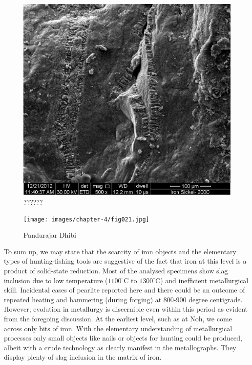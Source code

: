 \newpage

\begin{figure}[H]
\setcounter{figure}{19}
\includegraphics[scale=1]{images/chapter-4/fig020.jpg}
\caption{??????}\label{chapter-4-fig20}
\end{figure}

\begin{figure}[H]
\texttt{[image: images/chapter-4/fig021.jpg]}
\caption{Pandurajar Dhibi}\label{chapter-4-fig21}
\end{figure}


\newpage

To sum up, we may state that the scarcity of iron objects and the elementary types of hunting-fishing tools are suggestive of the fact that iron at this level is a product of solid-state reduction. Most of the analysed specimens show slag inclusion due to low temperature ($1100^{\circ}$C to $1300^{\circ}$C) and inefficient metallurgical skill. Incidental cases of pearlite reported here and there could be an outcome of repeated heating and hammering (during forging) at 800-900 degree centigrade. However, evolution in metallurgy is discernible even within this period as evident from the foregoing discussion. At the earliest level, such as at Noh, we come across only bits of iron. With the elementary understanding of metallurgical processes only small objects like nails or objects for hunting could be produced, albeit with a crude technology as clearly manifest in the metallographs. They display plenty of slag inclusion in the matrix of iron.

